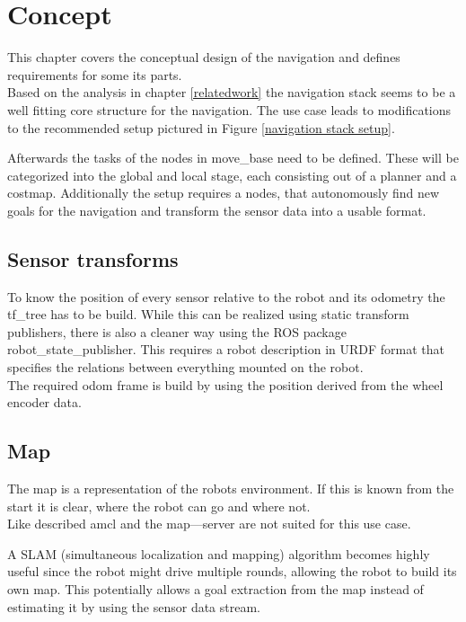 \chapter{Concept}
\label{Concept}

This chapter covers the conceptual design of the navigation and defines requirements for some its parts.\\

Based on the analysis in chapter \ref{relatedwork} the navigation stack seems to be a well fitting core structure for the navigation. The use case leads to modifications to the recommended setup pictured in Figure \ref{navigation stack setup}.

Afterwards the tasks of the nodes in move\_base need to be defined. These will be categorized into the global and local stage, each consisting out of a planner and a costmap.
Additionally the setup requires a nodes, that autonomously find new goals for the navigation and transform the sensor data into a usable format. 

\section{Sensor transforms}
To know the position of every sensor relative to the robot and its odometry the tf\_tree has to be build. While this can be realized using static transform publishers, there is also a cleaner way using the ROS package robot\_state\_publisher. This requires a robot description in URDF format that specifies the relations between everything mounted on the robot.\\

The required odom frame is build by using the position derived from the wheel encoder data.

\section{Map}

The map is a representation of the robots environment. If this is known from the start it is clear, where the robot can go and where not.\\

Like described amcl and the map—server are not suited for this use case.

A SLAM (simultaneous localization and mapping) algorithm becomes highly useful since the robot might drive multiple rounds, allowing the robot to build its own map. This potentially allows a goal extraction from the map instead of estimating it by using the sensor data stream.

